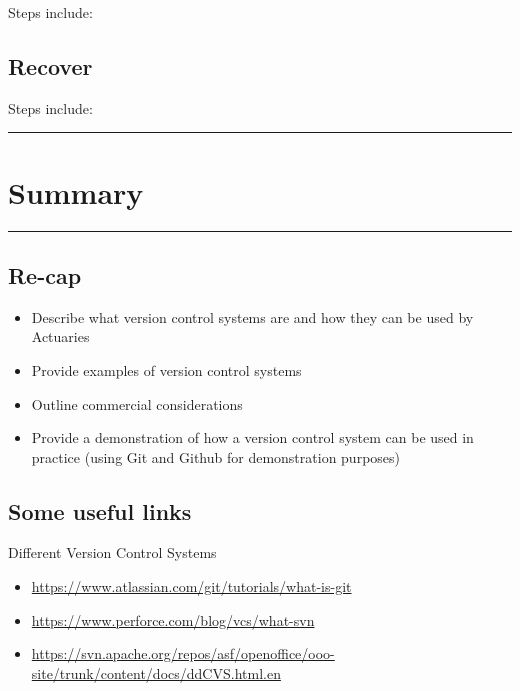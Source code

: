 \documentclass[
]{article}
\providecommand{\tightlist}{%
  \setlength{\itemsep}{0pt}\setlength{\parskip}{0pt}}
\begin{document}
Steps include:

\hypertarget{recover}{%
\subsection{Recover}\label{recover}}

Steps include:

\begin{center}\rule{0.5\linewidth}{0.5pt}\end{center}

\hypertarget{summary}{%
\section{Summary }\label{summary}}

\begin{center}\rule{0.5\linewidth}{0.5pt}\end{center}

\hypertarget{re-cap}{%
\subsection{Re-cap}\label{re-cap}}

\begin{itemize}
\tightlist
\item
  Describe what version control systems are and how they can be used by
  Actuaries
\item
  Provide examples of version control systems
\item
  Outline commercial considerations
\item
  Provide a demonstration of how a version control system can be used in
  practice (using Git and Github for demonstration purposes)
\end{itemize}

\hypertarget{some-useful-links}{%
\subsection{Some useful links}\label{some-useful-links}}

Different Version Control Systems

\begin{itemize}
\tightlist
\item
  \url{https://www.atlassian.com/git/tutorials/what-is-git}
\item
  \url{https://www.perforce.com/blog/vcs/what-svn}
\item
  \url{https://svn.apache.org/repos/asf/openoffice/ooo-site/trunk/content/docs/ddCVS.html.en}
\end{itemize}
\end{document}
